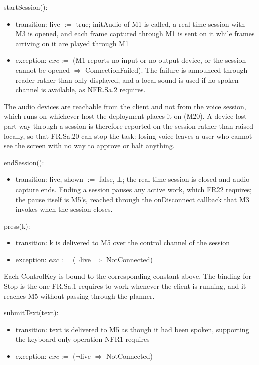 \documentclass[12pt, titlepage]{article}
\newcommand{\nil}{\bot}
\begin{document}
\noindent startSession():
\begin{itemize}
\item transition: live $:=$ true; initAudio of M1 is called, a real-time
session with M3 is opened, and each frame captured through M1 is sent on it
while frames arriving on it are played through M1
\item exception: $exc :=$ (M1 reports no input or no output device, or the
session cannot be opened $\Rightarrow$ ConnectionFailed). The failure is announced through reader rather than only
displayed, and a local sound is used if no spoken channel is available, as
NFR.Sa.2 requires.
\end{itemize}

\noindent The audio devices are reachable from the client and not from the
voice session, which runs on whichever host the deployment places it on (M20).
A device lost part way through a session is therefore reported on the session
rather than raised locally, so that FR.Sa.20 can stop the task: losing voice
leaves a user who cannot see the screen with no way to approve or halt
anything.

\noindent endSession():
\begin{itemize}
\item transition: live, shown $:=$ false, $\nil$; the real-time session is
closed and audio capture ends. Ending a session pauses any active work, which
FR22 requires; the pause itself is M5's, reached through the onDisconnect
callback that M3 invokes when the session closes.
\end{itemize}

\noindent press(k):
\begin{itemize}
\item transition: k is delivered to M5 over the control channel of the session
\item exception: $exc :=$ ($\lnot$live $\Rightarrow$ NotConnected)
\end{itemize}

\noindent Each ControlKey is bound to the corresponding constant above. The
binding for Stop is the one FR.Sa.1 requires to work whenever the client is
running, and it reaches M5 without passing through the planner.

\noindent submitText(text):
\begin{itemize}
\item transition: text is delivered to M5 as though it had been spoken,
supporting the keyboard-only operation NFR1 requires
\item exception: $exc :=$ ($\lnot$live $\Rightarrow$ NotConnected)
\end{itemize}
\end{document}
